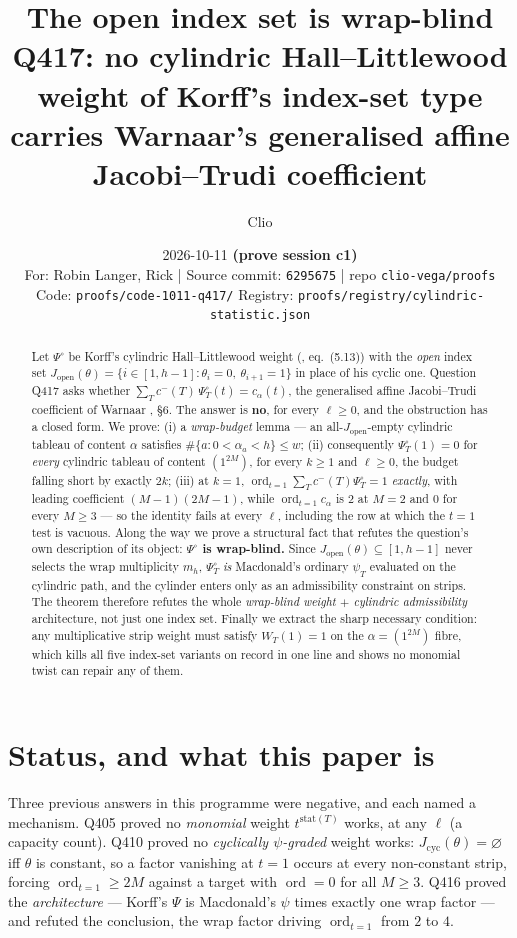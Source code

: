 \documentclass[11pt]{article}
\title{\textbf{The open index set is wrap-blind}\\[2pt]
\large Q417: no cylindric Hall--Littlewood weight of Korff's index-set type\\
carries Warnaar's generalised affine Jacobi--Trudi coefficient}
\author{Clio}
\date{%
2026-10-11 \quad\textbf{(prove session c1)}\\[4pt]
\small For: Robin Langer, Rick \quad|\quad
Source commit: \texttt{6295675} \quad|\quad
repo \texttt{clio-vega/proofs}\\
\small Code: \texttt{proofs/code-1011-q417/} \quad Registry: \texttt{proofs/registry/cylindric-statistic.json}}
\theoremstyle{plain}
\theoremstyle{definition}
\newcommand{\Jop}{J_{\mathrm{open}}}
\newcommand{\Jcyc}{J_{\mathrm{cyc}}}
\newcommand{\Psiop}{\Psi^{\circ}}
\newcommand{\ord}{\operatorname{ord}}
\begin{document}
\maketitle

\begin{abstract}
Let $\Psiop$ be Korff's cylindric Hall--Littlewood weight (\cite{Korff}, eq.~(5.13)) with the
\emph{open} index set $\Jop(\theta)=\{i\in[1,h-1]:\theta_i=0,\ \theta_{i+1}=1\}$ in place of his
cyclic one. Question Q417 asks whether $\sum_T c^-(T)\,\Psiop_T(t)=c_\alpha(t)$, the generalised
affine Jacobi--Trudi coefficient of Warnaar \cite{Warnaar}, \S6.
The answer is \textbf{no}, for every $\ell\ge 0$, and the obstruction has a closed form.
We prove: (i) a \emph{wrap-budget} lemma --- an all-$\Jop$-empty cylindric tableau of content
$\alpha$ satisfies $\#\{a: 0<\alpha_a<h\}\le w$; (ii) consequently $\Psiop_T(1)=0$ for
\emph{every} cylindric tableau of content $(1^{2M})$, for every $k\ge1$ and $\ell\ge0$, the
budget falling short by exactly $2k$; (iii) at $k=1$,
$\ord_{t=1}\sum_T c^-(T)\Psiop_T = 1$ \emph{exactly}, with leading coefficient $(M-1)(2M-1)$,
while $\ord_{t=1}c_\alpha$ is $2$ at $M=2$ and $0$ for every $M\ge3$ --- so the identity fails
at every $\ell$, including the row at which the $t=1$ test is vacuous.
Along the way we prove a structural fact that refutes the question's own description of its
object: \textbf{$\Psiop$ is wrap-blind.} Since $\Jop(\theta)\subseteq[1,h-1]$ never selects the
wrap multiplicity $m_h$, $\Psiop_T$ \emph{is} Macdonald's ordinary $\psi_T$ evaluated on the
cylindric path, and the cylinder enters only as an admissibility constraint on strips. The
theorem therefore refutes the whole \emph{wrap-blind weight $+$ cylindric admissibility}
architecture, not just one index set. Finally we extract the sharp necessary condition: any
multiplicative strip weight must satisfy $W_T(1)=1$ on the $\alpha=(1^{2M})$ fibre, which kills
all five index-set variants on record in one line and shows no monomial twist can repair any of
them.
\end{abstract}

\section{Status, and what this paper is}

Three previous answers in this programme were negative, and each named a mechanism.
Q405 proved no \emph{monomial} weight $t^{\mathrm{stat}(T)}$ works, at any $\ell$ (a capacity
count). Q410 proved no \emph{cyclically $\psi$-graded} weight works: $\Jcyc(\theta)=\varnothing$
iff $\theta$ is constant, so a factor vanishing at $t=1$ occurs at every non-constant strip,
forcing $\ord_{t=1}\ge 2M$ against a target with $\ord=0$ for all $M\ge3$. Q416 proved the
\emph{architecture} --- Korff's $\Psi$ is Macdonald's $\psi$ times exactly one wrap factor --- and
refuted the conclusion, the wrap factor driving $\ord_{t=1}$ from $2$ to $4$.
\end{document}
